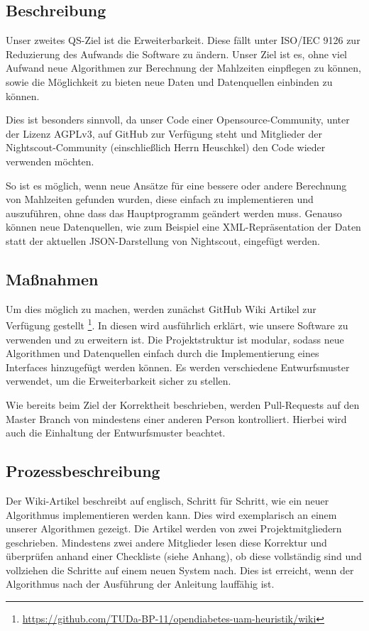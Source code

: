 \documentclass[accentcolor=tud0b,12pt,paper=a4]{tudreport}
\begin{document}
\subsection{Beschreibung}

Unser zweites QS-Ziel ist die Erweiterbarkeit. Diese fällt unter ISO/IEC 9126 zur Reduzierung des Aufwands die Software zu ändern. Unser Ziel ist es, ohne viel Aufwand neue Algorithmen zur Berechnung der Mahlzeiten einpflegen zu können, sowie die Möglichkeit zu bieten neue Daten und Datenquellen einbinden zu können.

Dies ist besonders sinnvoll, da unser Code einer Opensource-Community, unter der Lizenz AGPLv3, auf GitHub zur Verfügung steht und Mitglieder der Nightscout-Community (einschließlich Herrn Heuschkel) den Code wieder verwenden möchten.

So ist es möglich, wenn neue Ansätze für eine bessere oder andere Berechnung von Mahlzeiten gefunden wurden, diese einfach zu implementieren und auszuführen, ohne dass das Hauptprogramm geändert werden muss. Genauso können neue Datenquellen, wie zum Beispiel eine XML-Repräsentation der Daten statt der aktuellen JSON-Darstellung von Nightscout, eingefügt werden.

\subsection{Maßnahmen}

Um dies möglich zu machen, werden zunächst GitHub Wiki Artikel zur Verfügung gestellt \footnote{\url{https://github.com/TUDa-BP-11/opendiabetes-uam-heuristik/wiki}}. In diesen wird ausführlich erklärt, wie unsere Software zu verwenden und zu erweitern ist. Die Projektstruktur ist modular, sodass neue Algorithmen und Datenquellen einfach durch die Implementierung eines Interfaces hinzugefügt werden können. Es werden verschiedene Entwurfsmuster verwendet, um die Erweiterbarkeit sicher zu stellen.

Wie bereits beim Ziel der Korrektheit beschrieben, werden Pull-Requests auf den Master Branch von mindestens einer anderen Person kontrolliert. Hierbei wird auch die Einhaltung der Entwurfsmuster beachtet.

\subsection{Prozessbeschreibung}

Der Wiki-Artikel beschreibt auf englisch, Schritt für Schritt, wie ein neuer Algorithmus implementieren werden kann. Dies wird exemplarisch an einem unserer Algorithmen gezeigt. Die Artikel werden von zwei Projektmitgliedern geschrieben. Mindestens zwei andere Mitglieder lesen diese Korrektur und überprüfen anhand einer Checkliste (siehe Anhang), ob diese vollständig sind und vollziehen die Schritte auf einem neuen System nach. Dies ist erreicht, wenn der Algorithmus nach der Ausführung der Anleitung lauffähig ist.
\end{document}
